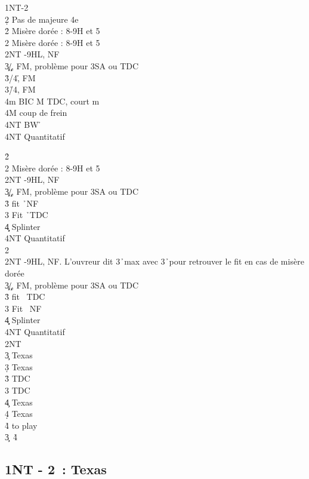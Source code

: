 \documentclass[a4paper]{article}
\begin{document}
\begin{bidtable}
1NT-2\c\\
2\d \> Pas de majeure 4e\+\\
2\h \> Misère dorée : 8-9H et 5\h \\
2\s \> Misère dorée : 8-9H et 5\s \\
2NT -9HL, NF\\
3\c\d {}\c /\d , FM, problème pour 3SA ou TDC\\
3\h {}\s /4\h , FM\\
3\s {}\h /4\s , FM\\
4m \> BIC M TDC, court m\+\\
4M \> coup de frein\\
4NT \> BW \h \-\\
4NT \> Quantitatif\-
\end{bidtable}

\begin{bidtable}
2\h\+\\
2\s \> Misère dorée : 8-9H et 5\s \\
2NT -9HL, NF\\
3\c\d {}\c /\d , FM, problème pour 3SA ou TDC\\
3\h \> fit \h\ NF\\
3\s \> Fit \h\ TDC\\
4\c\d \> Splinter\\
4NT \> Quantitatif\-\\
2\s\+\\
2NT -9HL, NF. L'ouvreur dit 3\h\ max avec 3\h\ pour retrouver le fit en cas de misère dorée\\
3\c\d {}\c /\d , FM, problème pour 3SA ou TDC\\
3\h \> fit \s\ TDC\\
3\s \> Fit \s\ NF\\
4\c\d \> Splinter\\
4NT \> Quantitatif\-\\
2NT\+\\
3\c \> Texas \h \\
3\d \> Texas \s \\
3\h \> TDC\\
3\s \> TDC\\
4\c \> Texas \h \\
4\d \> Texas \s \\
4\h\s \> to play\-\\
3\c {}\s\ 4\h 
\end{bidtable}

\subsection{1NT - 2\pdfd\ : Texas \pdfh}
\end{document}
